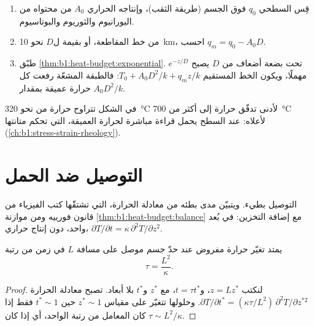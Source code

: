 \begin{method}\label{met:b1:heat-budget:moho}
\begin{enumerate}
  \item قِس  السطحي $q_0$ فوق الجسم (طريقة الثقب)، وإنتاجه الحراري $A_0$ من محتواه من اليورانيوم والثوريوم والبوتاسيوم.
  \item من خط المقاطعة، أو بقيمة ل$D$ نحو \qty{10}{km}، احسب $q_m = q_0 - A_0 D$.
  \item طبّق \cref{thm:b1:heat-budget:exponential}. تحت بضعة أضعاف من $D$ يصبح $e^{-z/D}$ مهملًا، ويكون  الخط المستقيم $T_0 + A_0D^2/k + q_m z/k$: فالطبقة المشعّة رفعت كل حرارة عميقة بمقدار $A_0D^2/k$.
\end{enumerate}
\end{method}

في الشكل تتراوح حرارة  من نحو \qty{320}{\degreeCelsius} لأدنى تدفّق حرارة إلى أكثر من \qty{700}{\degreeCelsius} لأعلاه:  عند السطح يحمل قراءة مباشرة لحرارة  العميقة، التي تحكم متانتها (\cref{ch:b1:stress-strain-rheology}).

\section{التوصيل ضد الحمل}

التوصيل بطيء. ويتبيّن مدى بطئه من معادلة الحرارة، التي تشتقّها كتب الفيزياء من قانون فورييه ومن موازنة \cref{thm:b1:heat-budget:balance} مع إضافة التخزين: في بُعد واحد، دون إنتاج حراري، $\partial T/\partial t = \kappa\,\partial^2 T/\partial z^2$.

\begin{proposition}\label{prop:b1:heat-budget:timescale}
يمتد تغيّر حرارة مفروض عند حدّ جسم موصل على مسافة $L$ في زمن من رتبة
\[
  \tau = \frac{L^2}{\kappa} .
\]
\end{proposition}

\begin{proof}
لنكتب $z = L z^*$، و$t = \tau t^*$، مع $z^*$ و$t^*$ بلا أبعاد. تصبح معادلة الحرارة $\partial T/\partial t^* = (\kappa\tau/L^2)\,\partial^2
T/\partial z^{*2}$. وحلولها تتغيّر على مقياس $z^* \sim 1$ حين $t^* \sim 1$ فقط إذا كان المعامل من رتبة الواحد، أي إذا كان $\tau \sim L^2/\kappa$.
\end{proof}

